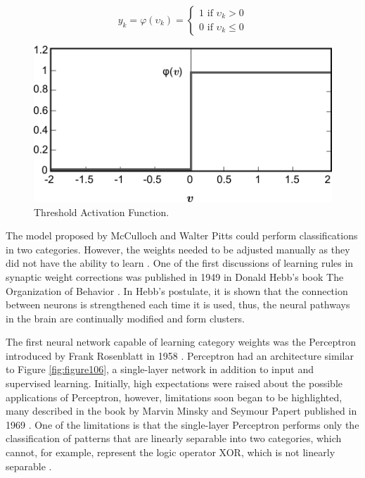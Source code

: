 \begin{equation}
\label{thresholdactivation}
y_k=\varphi(\upsilon_k)=
\begin{cases}
 1 \text{ if } \upsilon_k > 0 \\ 
 0 \text{ if } \upsilon_k \leq 0 
\end{cases}  
\end{equation}

\begin{figure}
    \centering
    \includegraphics[scale=0.55]{images/figure105.png}
    \caption{Threshold Activation Function.}
    \label{fig:figure105}
\end{figure}

The model proposed by McCulloch and Walter Pitts could perform classifications in two categories. However, the weights needed to be adjusted manually as they did not have the ability to learn \cite{goodfellow2016}. One of the first discussions of learning rules in synaptic weight corrections was published in 1949 in Donald Hebb's book The Organization of Behavior \cite{haykin1999}. In Hebb's postulate, it is shown that the connection between neurons is strengthened each time it is used, thus, the neural pathways in the brain are continually modified and form clusters.

The first neural network capable of learning category weights was the Perceptron introduced by Frank Rosenblatt in 1958 \cite{haykin1999}. Perceptron had an architecture similar to Figure \ref{fig:figure106}, a single-layer network in addition to input and supervised learning. Initially, high expectations were raised about the possible applications of Perceptron, however, limitations soon began to be highlighted, many described in the book by Marvin Minsky and Seymour Papert published in 1969 \cite{minsky1969perceptrons}. One of the limitations is that the single-layer Perceptron performs only the classification of patterns that are linearly separable into two categories, which cannot, for example, represent the logic operator XOR, which is not linearly separable \cite{haykin1999}.



